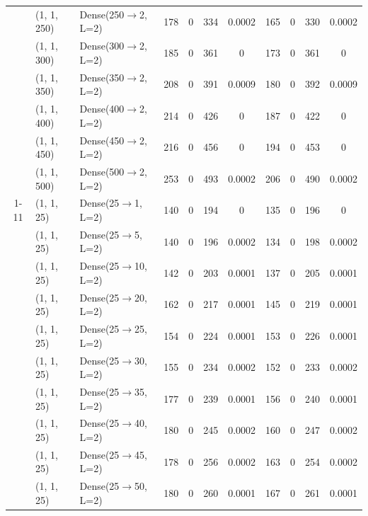 \begin{tabular}{cllcccccccc}
 & (1, 1, 250) & Dense(250$\to$2, L=2) & 178 & 0 & 334 & 0.0002 & 165 & 0 & 330 & 0.0002 \\
 & (1, 1, 300) & Dense(300$\to$2, L=2) & 185 & 0 & 361 & 0 & 173 & 0 & 361 & 0 \\
 & (1, 1, 350) & Dense(350$\to$2, L=2) & 208 & 0 & 391 & 0.0009 & 180 & 0 & 392 & 0.0009 \\
 & (1, 1, 400) & Dense(400$\to$2, L=2) & 214 & 0 & 426 & 0 & 187 & 0 & 422 & 0 \\
 & (1, 1, 450) & Dense(450$\to$2, L=2) & 216 & 0 & 456 & 0 & 194 & 0 & 453 & 0 \\
 & (1, 1, 500) & Dense(500$\to$2, L=2) & 253 & 0 & 493 & 0.0002 & 206 & 0 & 490 & 0.0002 \\
\cmidrule(lr){1-11}
\multirow{10}{*}{\rotatebox[origin=c]{90}{Output Size}} & (1, 1, 25) & Dense(25$\to$1, L=2) & 140 & 0 & 194 & 0 & 135 & 0 & 196 & 0 \\
 & (1, 1, 25) & Dense(25$\to$5, L=2) & 140 & 0 & 196 & 0.0002 & 134 & 0 & 198 & 0.0002 \\
 & (1, 1, 25) & Dense(25$\to$10, L=2) & 142 & 0 & 203 & 0.0001 & 137 & 0 & 205 & 0.0001 \\
 & (1, 1, 25) & Dense(25$\to$20, L=2) & 162 & 0 & 217 & 0.0001 & 145 & 0 & 219 & 0.0001 \\
 & (1, 1, 25) & Dense(25$\to$25, L=2) & 154 & 0 & 224 & 0.0001 & 153 & 0 & 226 & 0.0001 \\
 & (1, 1, 25) & Dense(25$\to$30, L=2) & 155 & 0 & 234 & 0.0002 & 152 & 0 & 233 & 0.0002 \\
 & (1, 1, 25) & Dense(25$\to$35, L=2) & 177 & 0 & 239 & 0.0001 & 156 & 0 & 240 & 0.0001 \\
 & (1, 1, 25) & Dense(25$\to$40, L=2) & 180 & 0 & 245 & 0.0002 & 160 & 0 & 247 & 0.0002 \\
 & (1, 1, 25) & Dense(25$\to$45, L=2) & 178 & 0 & 256 & 0.0002 & 163 & 0 & 254 & 0.0002 \\
 & (1, 1, 25) & Dense(25$\to$50, L=2) & 180 & 0 & 260 & 0.0001 & 167 & 0 & 261 & 0.0001 \\
\bottomrule
\end{tabular}